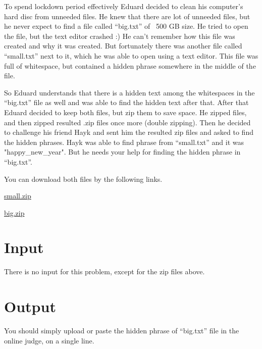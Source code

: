 To spend lockdown period effectively Eduard decided to clean his computer's hard disc from unneeded files.
He knew that there are lot of unneeded files, but he never expect to find a file called ``big.txt'' of ~500 GB size.
He tried to open the file, but the text editor crashed :)
He can't remember how this file was created and why it was created.
But fortunately there was another file called ``small.txt'' next to it, which he was able to open using a text editor.
This file was full of whitespace, but contained a hidden phrase somewhere in the middle of the file.

So Eduard understands that there is a hidden text among the whitespaces in the ``big.txt'' file as well and was able to find the hidden text after that.
After that Eduard decided to keep both files, but zip them to save space.
He zipped files, and then zipped resulted .zip files once more (double zipping).
Then he decided to challenge his friend Hayk and sent him the resulted zip files and asked to find the hidden phrases.
Hayk was able to find phrase from ``small.txt'' and it was "happy\_new\_year".
But he needs your help for finding the hidden phrase in ``big.txt''.

You can download both files by the following links.

\begin{center}
    \href{http://167.71.248.201/ejudge/small.zip}{small.zip}
    
    \href{http://167.71.248.201/ejudge/big.zip}{big.zip}
\end{center}

\section*{Input}
There is no input for this problem, except for the zip files above.

\section*{Output}
You should simply upload or paste the hidden phrase of ``big.txt'' file in the online judge, on a single line.
